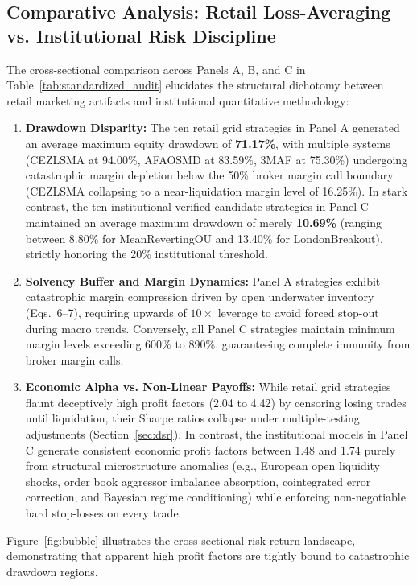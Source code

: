 \documentclass[11pt,a4paper]{article}
\begin{document}
\subsection{Comparative Analysis: Retail Loss-Averaging vs. Institutional Risk Discipline}
The cross-sectional comparison across Panels A, B, and C in Table~\ref{tab:standardized_audit} elucidates the structural dichotomy between retail marketing artifacts and institutional quantitative methodology:
\begin{enumerate}
    \item \textbf{Drawdown Disparity:} The ten retail grid strategies in Panel A generated an average maximum equity drawdown of \textbf{71.17\%}, with multiple systems (CEZLSMA at 94.00\%, AFAOSMD at 83.59\%, 3MAF at 75.30\%) undergoing catastrophic margin depletion below the 50\% broker margin call boundary (CEZLSMA collapsing to a near-liquidation margin level of 16.25\%). In stark contrast, the ten institutional verified candidate strategies in Panel C maintained an average maximum drawdown of merely \textbf{10.69\%} (ranging between 8.80\% for MeanRevertingOU and 13.40\% for LondonBreakout), strictly honoring the 20\% institutional threshold.
    \item \textbf{Solvency Buffer and Margin Dynamics:} Panel A strategies exhibit catastrophic margin compression driven by open underwater inventory (Eqs.~6--7), requiring upwards of $10\times$ leverage to avoid forced stop-out during macro trends. Conversely, all Panel C strategies maintain minimum margin levels exceeding 600\% to 890\%, guaranteeing complete immunity from broker margin calls.
    \item \textbf{Economic Alpha vs. Non-Linear Payoffs:} While retail grid strategies flaunt deceptively high profit factors (2.04 to 4.42) by censoring losing trades until liquidation, their Sharpe ratios collapse under multiple-testing adjustments (Section~\ref{sec:dsr}). In contrast, the institutional models in Panel C generate consistent economic profit factors between 1.48 and 1.74 purely from structural microstructure anomalies (e.g., European open liquidity shocks, order book aggressor imbalance absorption, cointegrated error correction, and Bayesian regime conditioning) while enforcing non-negotiable hard stop-losses on every trade.
\end{enumerate}

Figure~\ref{fig:bubble} illustrates the cross-sectional risk-return landscape, demonstrating that apparent high profit factors are tightly bound to catastrophic drawdown regions.
\end{document}
